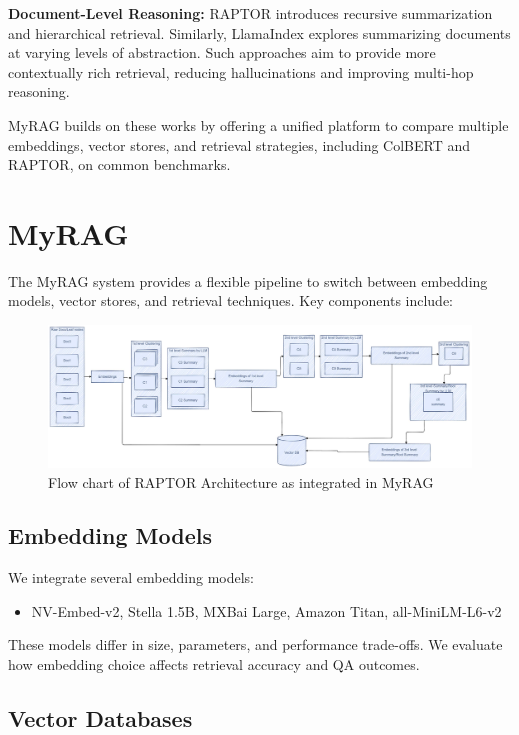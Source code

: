 \documentclass{scrartcl}
\begin{document}
\textbf{Document-Level Reasoning:} RAPTOR \cite{wu2021recursively, raptor2024} introduces recursive summarization and hierarchical retrieval. Similarly, LlamaIndex \cite{liu2022llamaindex} explores summarizing documents at varying levels of abstraction. Such approaches aim to provide more contextually rich retrieval, reducing hallucinations and improving multi-hop reasoning.

MyRAG builds on these works by offering a unified platform to compare multiple embeddings, vector stores, and retrieval strategies, including ColBERT and RAPTOR, on common benchmarks.

\section{MyRAG}

The MyRAG system provides a flexible pipeline to switch between embedding models, vector stores, and retrieval techniques. Key components include:

\begin{figure}[h]
	\centering
	\includegraphics[width=\linewidth]{Raptor.pdf}
	\caption{Flow chart of RAPTOR Architecture as integrated in MyRAG}
	\label{fig:raptor}
\end{figure}

\subsection{Embedding Models}

We integrate several embedding models:
\begin{itemize}
    \item NV-Embed-v2, Stella 1.5B, MXBai Large, Amazon Titan, all-MiniLM-L6-v2
\end{itemize}
These models differ in size, parameters, and performance trade-offs. We evaluate how embedding choice affects retrieval accuracy and QA outcomes.

\subsection{Vector Databases}
\end{document}
